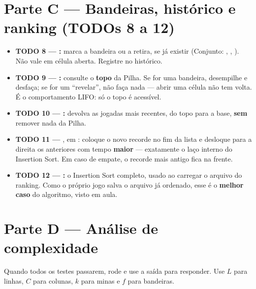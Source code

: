 \documentclass[11pt]{article}
\begin{document}
\section{Parte C — Bandeiras, histórico e ranking (TODOs 8 a 12)}

\begin{itemize}
  \item \textbf{TODO 8 — :} marca a bandeira ou a retira, se já
        existir (Conjunto: , , ). Não vale em
        célula aberta. Registre  no histórico.
  \item \textbf{TODO 9 — :} consulte o \textbf{topo} da Pilha. Se for uma
        bandeira, desempilhe e desfaça; se for um \enquote{revelar}, não faça nada — abrir uma
        célula não tem volta. É o comportamento LIFO: só o topo é acessível.
  \item \textbf{TODO 10 — :} devolva as jogadas mais recentes, do topo
        para a base, \textbf{sem} remover nada da Pilha.
  \item \textbf{TODO 11 — }, em : coloque o novo
        recorde no fim da lista e desloque para a direita os anteriores com tempo
        \textbf{maior} — exatamente o laço interno do Insertion Sort. Em caso de empate, o
        recorde mais antigo fica na frente.
  \item \textbf{TODO 12 — :} o Insertion Sort completo, usado ao
        carregar o arquivo do ranking. Como o próprio jogo salva o arquivo já ordenado, esse é o
        \textbf{melhor caso} do algoritmo, visto em aula.
\end{itemize}

\section{Parte D — Análise de complexidade}

Quando todos os testes passarem, rode  e use a saída para
responder. Use $L$ para linhas, $C$ para colunas, $k$ para minas e $f$ para bandeiras.
\end{document}
